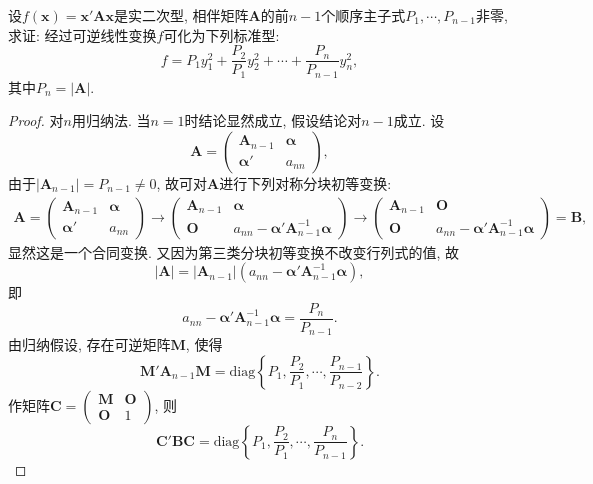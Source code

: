 \documentclass[../../main.tex]{subfiles}%
\begin{document}
\begin{proposition}\label{proposition:利用顺序主子式计算二次型的标准型}
设$f(\boldsymbol{x}) = \boldsymbol{x}'\boldsymbol{A}\boldsymbol{x}$是实二次型, 相伴矩阵$\boldsymbol{A}$的前$n - 1$个顺序主子式$P_1, \cdots, P_{n - 1}$非零, 求证: 经过可逆线性变换$f$可化为下列标准型:
\[
f = P_1y_1^2 + \frac{P_2}{P_1}y_2^2 + \cdots + \frac{P_n}{P_{n - 1}}y_n^2,
\]
其中$P_n = |\boldsymbol{A}|$.
\end{proposition}
\begin{proof}
对$n$用归纳法. 当$n = 1$时结论显然成立, 假设结论对$n - 1$成立. 设
\[
\boldsymbol{A}=\begin{pmatrix}
\boldsymbol{A}_{n - 1} & \boldsymbol{\alpha} \\
\boldsymbol{\alpha}' & a_{nn}
\end{pmatrix},
\]
由于$|\boldsymbol{A}_{n - 1}| = P_{n - 1}\neq 0$, 故可对$\boldsymbol{A}$进行下列对称分块初等变换:
\begin{align*}
\boldsymbol{A}=\begin{pmatrix}
\boldsymbol{A}_{n - 1} & \boldsymbol{\alpha} \\
\boldsymbol{\alpha}' & a_{nn}
\end{pmatrix}
\rightarrow
\begin{pmatrix}
\boldsymbol{A}_{n - 1} & \boldsymbol{\alpha} \\
\boldsymbol{O} & a_{nn}-\boldsymbol{\alpha}'\boldsymbol{A}_{n - 1}^{-1}\boldsymbol{\alpha}
\end{pmatrix}
\rightarrow
\begin{pmatrix}
\boldsymbol{A}_{n - 1} & \boldsymbol{O} \\
\boldsymbol{O} & a_{nn}-\boldsymbol{\alpha}'\boldsymbol{A}_{n - 1}^{-1}\boldsymbol{\alpha}
\end{pmatrix}
=\boldsymbol{B},
\end{align*}
显然这是一个合同变换. 又因为第三类分块初等变换不改变行列式的值, 故
\[
|\boldsymbol{A}| = |\boldsymbol{A}_{n - 1}|(a_{nn}-\boldsymbol{\alpha}'\boldsymbol{A}_{n - 1}^{-1}\boldsymbol{\alpha}),
\]
即
\[
a_{nn}-\boldsymbol{\alpha}'\boldsymbol{A}_{n - 1}^{-1}\boldsymbol{\alpha}=\frac{P_n}{P_{n - 1}}.
\]
由归纳假设, 存在可逆矩阵$\boldsymbol{M}$, 使得
\[
\boldsymbol{M}'\boldsymbol{A}_{n - 1}\boldsymbol{M}=\text{diag}\left\{P_1, \frac{P_2}{P_1}, \cdots, \frac{P_{n - 1}}{P_{n - 2}}\right\}.
\]
作矩阵$\boldsymbol{C}=\begin{pmatrix}
\boldsymbol{M} & \boldsymbol{O} \\
\boldsymbol{O} & 1
\end{pmatrix}$, 则
\[
\boldsymbol{C}'\boldsymbol{B}\boldsymbol{C}=\text{diag}\left\{P_1, \frac{P_2}{P_1}, \cdots, \frac{P_n}{P_{n - 1}}\right\}. 
\] 
\end{proof}
\end{document}
